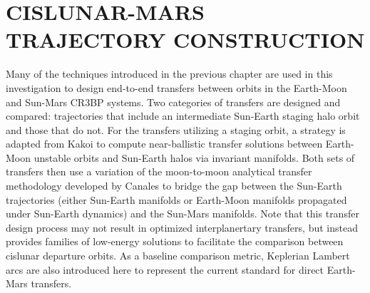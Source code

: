 \chapter{CISLUNAR-MARS TRAJECTORY CONSTRUCTION}

Many of the techniques introduced in the previous chapter are used in this investigation to design
end-to-end transfers between orbits in the Earth-Moon and Sun-Mars CR3BP systems. Two categories of
transfers are designed and compared: trajectories that include an intermediate Sun-Earth staging
halo orbit and those that do not. For the transfers utilizing a staging orbit, a strategy is
adapted from Kakoi to compute near-ballistic transfer solutions between Earth-Moon unstable orbits
and Sun-Earth halos via invariant manifolds\cite{Kakoi:2015}. Both sets of transfers then use a
variation of the moon-to-moon analytical transfer methodology developed by Canales to bridge the
gap between the Sun-Earth trajectories (either Sun-Earth manifolds or Earth-Moon manifolds
propagated under Sun-Earth dynamics) and the Sun-Mars manifolds\cite{Canales:2021b}. Note that this
transfer design process may not result in optimized interplanertary transfers, but instead provides
families of low-energy solutions to facilitate the comparison between cislunar departure orbits. As
a baseline comparison metric, Keplerian Lambert arcs are also introduced here to represent the
current standard for direct Earth-Mars transfers.




